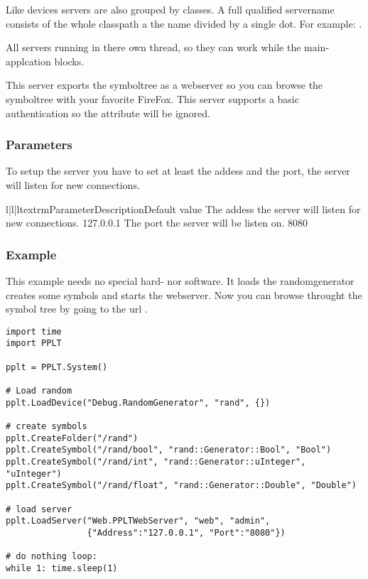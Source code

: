 Like devices servers are also grouped by classes. A full qualified servername
consists of the whole classpath a the name divided by a single dot. For 
example: .

All servers running in there own thread, so they can work while the 
main-applcation blocks.


This server exports the symboltree as a webserver so you can browse the 
symboltree with your favorite FireFox. This server supports a basic 
authentication so the  attribute will be ignored.

\subsubsection{Parameters}
To setup the server you have to set at least the addess and the port, the 
server will listen for new connections.
\begin{tableiii}{l|l|l}{textrm}{Parameter}{Description}{Default value}
        {The addess the server will listen for new connections.}
        {127.0.0.1}
        {The port the server will be listen on.}
        {8080}
\end{tableiii}

\subsubsection{Example}
This example needs no special hard- nor software. It loads the randomgenerator
creates some symbols and starts the webserver. Now you can browse throught the
symbol tree by going to the url .
\begin{verbatim}
import time
import PPLT

pplt = PPLT.System()

# Load random
pplt.LoadDevice("Debug.RandomGenerator", "rand", {})

# create symbols
pplt.CreateFolder("/rand")
pplt.CreateSymbol("/rand/bool", "rand::Generator::Bool", "Bool")
pplt.CreateSymbol("/rand/int", "rand::Generator::uInteger", "uInteger")
pplt.CreateSymbol("/rand/float", "rand::Generator::Double", "Double")

# load server
pplt.LoadServer("Web.PPLTWebServer", "web", "admin", 
                {"Address":"127.0.0.1", "Port":"8080"})

# do nothing loop:
while 1: time.sleep(1)
    
\end{verbatim}





